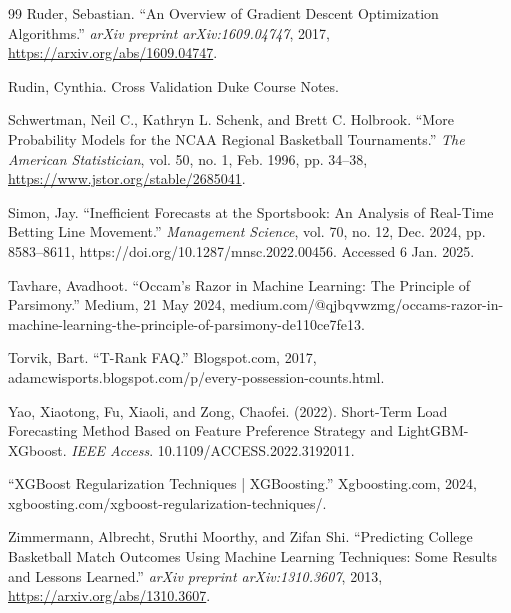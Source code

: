 \documentclass[12pt,leqno]{article}\usepackage[pdftex]{graphicx}\usepackage[dvipsnames]{xcolor}
\theoremstyle{remark}
\begin{document}
\begin{thebibliography}{99}
 Ruder, Sebastian. ``An Overview of Gradient Descent Optimization Algorithms.'' \textit{arXiv preprint arXiv:1609.04747}, 2017, \url{https://arxiv.org/abs/1609.04747}.

 Rudin, Cynthia. Cross Validation Duke Course Notes.

 Schwertman, Neil C., Kathryn L. Schenk, and Brett C. Holbrook. ``More Probability Models for the NCAA Regional Basketball Tournaments.'' \textit{The American Statistician}, vol. 50, no. 1, Feb. 1996, pp. 34--38, \url{https://www.jstor.org/stable/2685041}.

 Simon, Jay. “Inefficient Forecasts at the Sportsbook: An Analysis of Real-Time Betting Line Movement.” \textit{Management Science}, vol. 70, no. 12, Dec. 2024, pp. 8583–8611, https://doi.org/10.1287/mnsc.2022.00456. Accessed 6 Jan. 2025.

 Tavhare, Avadhoot. “Occam’s Razor in Machine Learning: The Principle of Parsimony.” Medium, 21 May 2024, medium.com/@qjbqvwzmg/occams-razor-in-machine-learning-the-principle-of-parsimony-de110ce7fe13.

 Torvik, Bart. “T-Rank FAQ.” Blogspot.com, 2017, adamcwisports.blogspot.com/p/every-possession-counts.html.

 Yao, Xiaotong, Fu, Xiaoli, and Zong, Chaofei. (2022). Short-Term Load Forecasting Method Based on Feature Preference Strategy and LightGBM-XGboost. \textit{IEEE Access}. 10.1109/ACCESS.2022.3192011.

 “XGBoost Regularization Techniques | XGBoosting.” Xgboosting.com, 2024, xgboosting.com/xgboost-regularization-techniques/.

 Zimmermann, Albrecht, Sruthi Moorthy, and Zifan Shi. ``Predicting College Basketball Match Outcomes Using Machine Learning Techniques: Some Results and Lessons Learned.'' \textit{arXiv preprint arXiv:1310.3607}, 2013, \url{https://arxiv.org/abs/1310.3607}.

\end{thebibliography}
\end{document}

